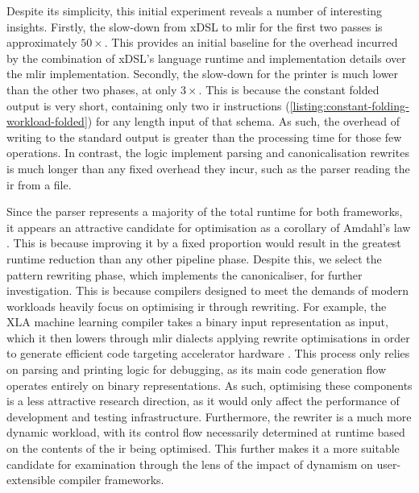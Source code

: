Despite its simplicity, this initial experiment reveals a number of interesting insights.
Firstly, the slow-down from xDSL to \ac{mlir} for the first two passes is approximately $50\times$. This provides an initial baseline for the overhead incurred by the combination of xDSL's language runtime and implementation details over the \ac{mlir} implementation.
Secondly, the slow-down for the printer is much lower than the other two phases, at only $3\times$.
This is because the constant folded output is very short, containing only two \ac{ir} instructions (\autoref{listing:constant-folding-workload-folded}) for any length input of that schema. As such, the overhead of writing to the standard output is greater than the processing time for those few operations. In contrast, the logic implement parsing and canonicalisation rewrites is much longer than any fixed overhead they incur, such as the parser reading the \ac{ir} from a file.

Since the parser represents a majority of the total runtime for both frameworks, it appears an attractive candidate for optimisation as a corollary of Amdahl's law \cite{amdahlValiditySingleProcessor1967}. This is because improving it by a fixed proportion would result in the greatest runtime reduction than any other pipeline phase.
Despite this, we select the pattern rewriting phase, which implements the canonicaliser, for further investigation.
This is because compilers designed to meet the demands of modern workloads heavily focus on optimising \ac{ir} through rewriting. For example, the XLA machine learning compiler takes a binary input representation as input, which it then lowers through \ac{mlir} dialects applying rewrite optimisations in order to generate efficient code targeting accelerator hardware \cite{sabne2020xla}. This process only relies on parsing and printing logic for debugging, as its main code generation flow operates entirely on binary representations.
As such, optimising these components is a less attractive research direction, as it would only affect the performance of development and testing infrastructure.
Furthermore, the rewriter is a much more dynamic workload, with its control flow necessarily determined at runtime based on the contents of the \ac{ir} being optimised.
This further makes it a more suitable candidate for examination through the lens of the impact of dynamism on user-extensible compiler frameworks.



